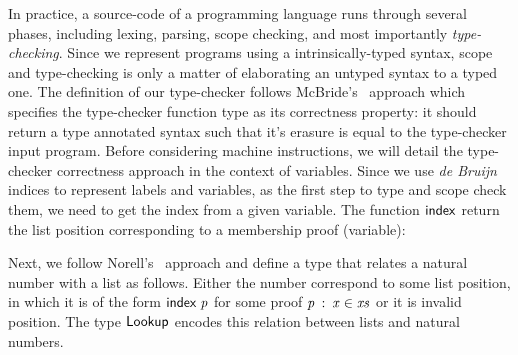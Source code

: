 \documentclass[review]{elsarticle}
\theoremstyle{definition}
\def\resethooks{%
  \global\let\SaveRestoreHook\empty
  \global\let\ColumnHook\empty}
\newcommand{\hsindent}[1]{\quad}%
\let\hspre\empty
\let\hspost\empty
\newcommand{\D}[1]{\blue{\mathsf{#1}}}
\newcommand{\Con}[1]{\red{\mathsf{#1}}}
\newcommand{\F}[1]{\green{\mathsf{#1}}}
\newcommand{\V}[1]{\purple{\mathit{#1}}}
\begin{document}
In practice, a source-code of a programming language runs through several phases,
including lexing, parsing, scope checking, and most importantly \emph{type-checking}.
Since we represent programs using a intrinsically-typed syntax, scope and
type-checking is only a matter of elaborating an untyped syntax to a typed one.
The definition of our type-checker follows McBride's~\cite{McBride2004} approach which
specifies the type-checker function type as its correctness property: it should return
a type annotated syntax such that it's erasure is equal to the type-checker input program.
Before considering machine instructions, we will detail the type-checker correctness
approach in the context of variables.
Since we use \emph{de Bruijn} indices to represent labels and variables, as the first
step to type and scope check them, we need to get the index from a given variable.
The function \ensuremath{\F{index}} return the list position corresponding to a membership proof (variable):
\resethooks
Next, we follow Norell's~\cite{Norell2009} approach and define a type that relates a
natural number with a list as follows. Either the number correspond to some list position,
in which it is of the form \ensuremath{\F{index}\;\V{p}} for some proof \ensuremath{\V{p}\;\mathbin{:}\;\V{x}\;\D{\in}\;\V{xs}} or it is invalid position.
The type \ensuremath{\D{Lookup}} encodes this relation between lists and natural numbers.
\resethooks
\end{document}
